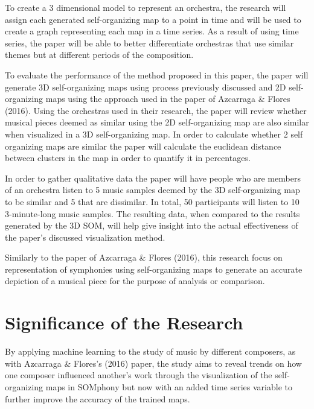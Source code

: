 To create a 3 dimensional model to represent an orchestra, the research will assign each generated self-organizing map to a point in time and will be used to create a graph representing each map in a time series. As a result of using time series, the paper will be able to better differentiate orchestras that use similar themes but at different periods of the composition.

To evaluate the performance of the method proposed in this paper, the paper will generate 3D self-organizing maps using process previously discussed and 2D self-organizing maps using the approach used in the paper of Azcarraga \& Flores (2016). Using the orchestras used in their research, the paper will review whether musical pieces deemed as similar using the 2D self-organizing map are also similar when visualized in a 3D self-organizing map. In order to calculate whether 2 self organizing maps are similar the paper will calculate the euclidean distance between clusters in the map in order to quantify it in percentages.

In order to gather qualitative data the paper will have people who are members of an orchestra listen to 5 music samples deemed by the 3D self-organizing map to be similar and 5 that are dissimilar. In total, 50 participants will listen to 10 3-minute-long music samples. The resulting data, when compared to the results generated by the 3D SOM, will help give insight into the actual effectiveness of the paper’s discussed visualization method.

Similarly to the paper of Azcarraga \& Flores (2016), this research focus on representation of symphonies using self-organizing maps to generate an accurate depiction of a musical piece for the purpose of analysis or comparison.

\section{Significance of the Research}
\label{sec:significance}
By applying machine learning to the study of music by different composers, as with Azcarraga \& Flores’s (2016) paper, the study aims to reveal trends on how one composer influenced another’s work through the visualization of the self-organizing maps in SOMphony but now with an added time series variable to further improve the accuracy of the trained maps.

